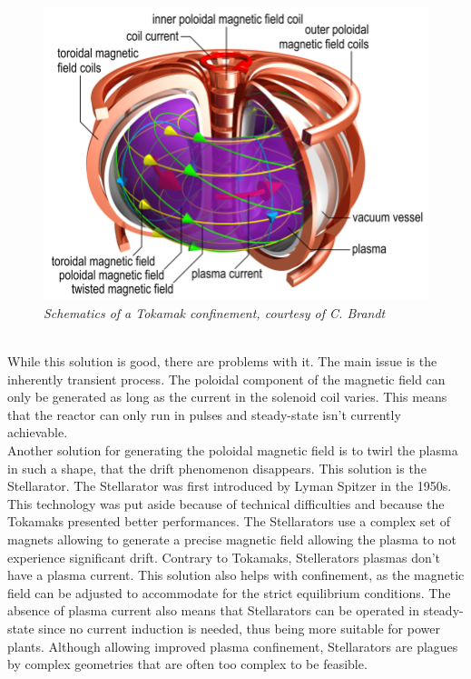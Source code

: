 \break
\begin{figure}[h!]
    \centering
    \includegraphics[width=.9\textwidth]{figures/fig_2.png}
    \caption{\it Schematics of a Tokamak confinement, courtesy of C. Brandt}
\end{figure}
\\
\break
\normalsize{\indent While this solution is good, there are problems with it. The main issue is the inherently transient process. The poloidal component of the magnetic field can only be generated as long as the current in the solenoid coil varies. This means that the reactor can only run in pulses and steady-state isn’t currently achievable.}
\\
\break
\normalsize{\indent Another solution for generating the poloidal magnetic field is to twirl the plasma in such a shape, that the drift phenomenon disappears. This solution is the Stellarator. The Stellarator was first introduced by Lyman Spitzer in the 1950s. This technology was put aside because of technical difficulties and because the Tokamaks presented better performances. The Stellarators use a complex set of magnets allowing to generate a precise magnetic field allowing the plasma to not experience significant drift. Contrary to Tokamaks, Stellerators plasmas don’t have a plasma current. This solution also helps with confinement, as the magnetic field can be adjusted to accommodate for the strict equilibrium conditions. The absence of plasma current also means that Stellarators can be operated in steady-state since no current induction is needed, thus being more suitable for power plants. Although allowing improved plasma confinement, Stellarators are plagues by complex geometries that are often too complex to be feasible.}
